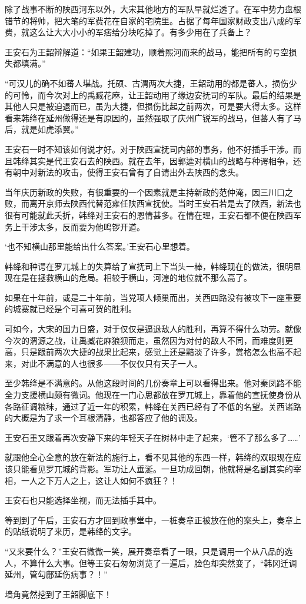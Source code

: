 除了战事不断的陕西河东以外，大宋其他地方的军队早就烂透了。在军中势力盘根错节的将帅，把大笔的军费花在自家的宅院里。占据了每年国家财政支出八成的军费，就这么让大大小小的军痞给分块吃掉了。有多少用在了兵备上？

王安石为王韶辩解道：“如果王韶建功，顺着熙河而来的战马，能把所有的亏空损失都填满。”

“可汉儿的确不如蕃人堪战。托硕、古渭两次大捷，王韶动用的都是蕃人，损伤少的可怜，而今次对上的禹臧花麻，让王韶动用了缘边安抚司的军队。最后的结果是其他人只是被迫退而已，虽为大捷，但损伤比起之前两次，可是要大得太多。这样看来韩绛在延州做得还是有原因的，虽然强取了庆州广锐军的战马，但蕃人有了马后，就是如虎添翼。”

王安石一时不知该如何说才好。对于陕西宣抚司内部的事务，他不好插手干涉。而且韩绛其实是代王安石去的陕西。就在去年，因郭逵对横山的战略与种谔相争，还有朝中对新法的攻击，使得王安石曾有了自请出外去陕西的念头。

当年庆历新政的失败，有很重要的一个因素就是主持新政的范仲淹，因三川口之败，而离开京师去陕西代替范雍任陕西宣抚使。当时王安石若是去了陕西，新法也很有可能就此夭折，韩绛对王安石的恩情甚多。在情在理，王安石都不便在陕西军务上干涉太多，反而要为他鸣锣开道。

‘也不知横山那里能给出什么答案。’王安石心里想着。

韩绛和种谔在罗兀城上的失算给了宣抚司上下当头一棒，韩绛现在的做法，很明显现在是在拯救横山的危局。相较于横山，河湟的地位就不那么高了。

如果在十年前，或是二十年前，当党项人倾巢而出，关西四路没有被攻下一座重要的城寨就已经是个可喜可贺的胜利。

可如今，大宋的国力日盛，对于仅仅是逼退敌人的胜利，再算不得什么功劳。就像今次的渭源之战，让禹臧花麻狼狈而走，虽然因为对付的敌人不同，而难度则更高，只是跟前两次大捷的战果比起来，感觉上还是黯淡了许多，赏格怎么也高不起来，对此不满意的人也很多——不仅仅只有天子一人。

至少韩绛是不满意的。从他这段时间的几份奏章上可以看得出来。他对秦凤路不能全力支援横山颇有微词。他现在一门心思都放在罗兀城上，靠着他的宣抚使身份从各路征调粮秣，通过了近一年的积累，韩绛在关西已经有了不低的名望。关西诸路的大概是为了求一个耳根清静，也都答应了他的调及。

王安石重又跟着再次安静下来的年轻天子在树林中走了起来，‘管不了那么多了……’

就跟他全心全意的放在新法的施行上，看不见其他的东西一样，韩绛的双眼现在应该只能看见罗兀城的背影。军功让人垂涎。一旦功成回朝，他就将是名副其实的宰相，一人之下万人之上，这让人如何不疯狂？！

王安石也只能选择坐视，而无法插手其中。

等到到了午后，王安石方才回到政事堂中，一桩奏章正被放在他的案头上，奏章上的贴纸说明了来历，是韩绛的文字。

“又来要什么？”王安石微微一笑，展开奏章看了一眼，只是调用一个从八品的选人，不算什么大事。但等王安石匆匆浏览了一遍后，脸色却突然变了，“韩冈迁调延州，管勾鄜延伤病事？！”

墙角竟然挖到了王韶脚底下！

